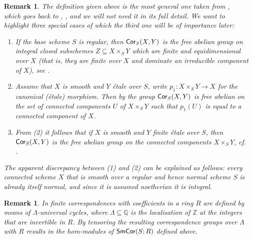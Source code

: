 \documentclass[reqno]{amsart}
\numberwithin{equation}{section}\theoremstyle{thms}
\theoremstyle{defn}
\newtheorem{rem}[equation]{Remark}
\newcommand{\bQ}{\mathbb{Q}}
\newcommand{\bZ}{\mathbb{Z}}
\newcommand{\tsf}[1]{\textsf{\textup{#1}}}
\newcommand{\corsms}[1]{\tsf{SmCor}(S;#1)}
\begin{document}
\begin{rem}\label{rem:nicecorrespondences}
The definition given above is the most general one taken from \cite[§9.1]{cd19}, which goes back to \cite[§3]{sv00}, \cite[Appendix 1A]{mvw06}, and we will not need it in its full detail. We want to highlight three special cases of which the third one will be of importance later:
\begin{enumerate}
    \item[(1)] If the base scheme $S$ is regular, then $\tsf{Cor}_S(X,Y)$ is the free abelian group on integral closed subschemes $Z \subseteq X \times_S Y$ which are finite and equidimensional over $X$ (that is, they are finite over $X$ and dominate an irreducible component of $X$), see \cite[Remark 8.3.29, 9.1.3]{cd19}.
    \item[(2)] Assume that $X$ is smooth and $Y$ étale over $S$, write $p_1: X \times_S Y \to X$ for the canonical (étale) morphism. Then by \cite[Lemma 10.2.6]{cd19} the group $\tsf{Cor}_S(X,Y)$ is free abelian on the set of connected components $U$ of $X \times_S Y$ such that $p_1(U)$ is equal to a connected component of $X$.
    \item[(3)] From (2) it follows that if $X$ is smooth and $Y$ finite étale over $S$, then $\tsf{Cor}_S(X,Y)$ is the free abelian group on the connected components $X \times_S Y$, cf. \cite[Proposition 10.2.5]{cd19}.
\end{enumerate}
The apparent discrepancy between (1) and (2) can be explained as follows: every connected scheme $X$ that is smooth over a regular and hence normal scheme $S$ is already itself normal, and since it is assumed noetherian it is integral.
\end{rem}

\begin{rem}
In \cite[§9]{cd19} finite correspondences with coefficients in a ring $R$ are defined by means of $\Lambda$-universal cycles, where $\Lambda \subseteq \bQ$ is the localisation of $\bZ$ at the integers that are invertible in $R$. By \cite[Remark 9.1.3]{cd19} tensoring the resulting correspondence groups over $\Lambda$ with $R$ results in the hom-modules of $\corsms{R}$ defined above. 
\end{rem}
\end{document}
